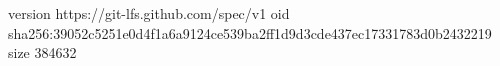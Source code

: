 version https://git-lfs.github.com/spec/v1
oid sha256:39052c5251e0d4f1a6a9124ce539ba2ff1d9d3cde437ec17331783d0b2432219
size 384632

